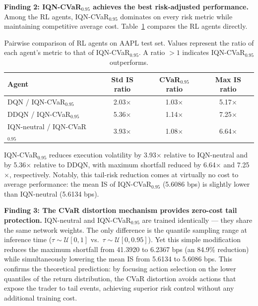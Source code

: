 \documentclass[11pt]{article}
\begin{document}
\textbf{Finding 2: IQN-CVaR$_{0.95}$ achieves the best risk-adjusted performance.}  Among the RL agents, IQN-CVaR$_{0.95}$ dominates on every risk metric while maintaining competitive average cost.  Table~\ref{tab:taq_comparison} compares the RL agents directly.

\begin{table}[H]
    \centering
    \begin{tabular}{@{}lccc@{}}
        \toprule
        \textbf{Agent} & \textbf{Std IS ratio} & \textbf{CVaR$_{0.95}$ ratio} & \textbf{Max IS ratio} \\
        \midrule
        DQN / IQN-CVaR$_{0.95}$           & 2.03$\times$ & 1.03$\times$ & 5.17$\times$ \\
        DDQN / IQN-CVaR$_{0.95}$          & 5.36$\times$ & 1.14$\times$ & 7.25$\times$ \\
        IQN-neutral / IQN-CVaR$_{0.95}$   & 3.93$\times$ & 1.08$\times$ & 6.64$\times$ \\
        \bottomrule
    \end{tabular}
    \caption{Pairwise comparison of RL agents on AAPL test set.  Values represent the ratio of each agent's metric to that of IQN-CVaR$_{0.95}$. A ratio $> 1$ indicates IQN-CVaR$_{0.95}$ outperforms.}
    \label{tab:taq_comparison}
\end{table}

IQN-CVaR$_{0.95}$ reduces execution volatility by 3.93$\times$ relative to IQN-neutral and by 5.36$\times$ relative to DDQN, with maximum shortfall reduced by 6.64$\times$ and 7.25$\times$, respectively.  Notably, this tail-risk reduction comes at virtually no cost to average performance: the mean IS of IQN-CVaR$_{0.95}$ (5.6086 bps) is slightly lower than IQN-neutral (5.6134 bps).

\textbf{Finding 3: The CVaR distortion mechanism provides zero-cost tail protection.}  IQN-neutral and IQN-CVaR$_{0.95}$ are trained identically --- they share the same network weights.  The only difference is the quantile sampling range at inference time ($\tau \sim \mathcal{U}[0, 1]$ vs.\ $\tau \sim \mathcal{U}[0, 0.95]$).  Yet this simple modification reduces the maximum shortfall from 41.3920 to 6.2367 bps (an 84.9\% reduction) while simultaneously lowering the mean IS from 5.6134 to 5.6086 bps.  This confirms the theoretical prediction: by focusing action selection on the lower quantiles of the return distribution, the CVaR distortion avoids actions that expose the trader to tail events, achieving superior risk control without any additional training cost.
\end{document}
